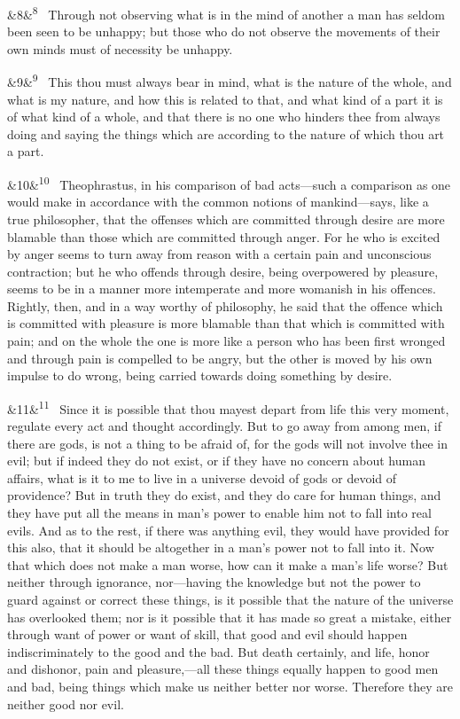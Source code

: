\documentclass[12pt]{article}
\newcommand{\para}[1][]{\par\noindent\ifx&#1&\else\textsuperscript{\footnotesize #1}~\fi}
\begin{document}
\para[8] Through not observing what is in the mind of another a man has seldom
been seen to be unhappy; but those who do not observe the movements of
their own minds must of necessity be unhappy.

\para[9] This thou must always bear in mind, what is the nature of the whole,
and what is my nature, and how this is related to that, and what kind of
a part it is of what kind of a whole, and that there is no one who
hinders thee from always doing and saying the things which are according
to the nature of which thou art a part.

\para[10] Theophrastus, in his comparison of bad acts---such a comparison as
one would make in accordance with the common notions of mankind---says,
like a true philosopher, that the offenses which are committed through
desire are more blamable than those which are committed through anger.
For he who is excited by anger seems to turn away from reason with a
certain pain and unconscious contraction; but he who offends through
desire, being overpowered by pleasure, seems to be in a manner more
intemperate and more womanish in his offences. Rightly, then, and in a
way worthy of philosophy, he said that the offence which is committed
with pleasure is more blamable than that which is committed with pain;
and on the whole the one is more like a person who has been first
wronged and through pain is compelled to be angry, but the other is
moved by his own impulse to do wrong, being carried towards doing
something by desire.

\para[11] Since it is possible that thou mayest depart from life this very
moment, regulate every act and thought accordingly. But to go away
from among men, if there are gods, is not a thing to be afraid of, for
the gods will not involve thee in evil; but if indeed they do not exist,
or if they have no concern about human affairs, what is it to me to live
in a universe devoid of gods or devoid of providence? But in truth they
do exist, and they do care for human things, and they have put all the
means in man's power to enable him not to fall into real evils. And as
to the rest, if there was anything evil, they would have provided for
this also, that it should be altogether in a man's power not to fall
into it. Now that which does not make a man worse, how can it make a
man's life worse? But neither through ignorance, nor---having the
knowledge but not the power to guard against or correct these things, is
it possible that the nature of the universe has overlooked them; nor is
it possible that it has made so great a mistake, either through want of
power or want of skill, that good and evil should happen
indiscriminately to the good and the bad. But death certainly, and life,
honor and dishonor, pain and pleasure,---all these things equally happen
to good men and bad, being things which make us neither better nor
worse. Therefore they are neither good nor evil.
\end{document}
